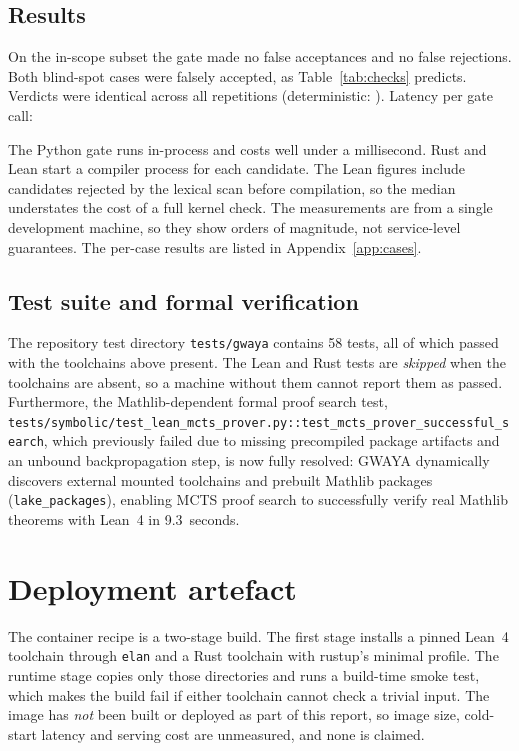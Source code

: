 \documentclass[11pt,a4paper,onecolumn]{article}
\begin{document}
\subsection{Results}
\begin{center}\confusionTable\end{center}
On the in-scope subset the gate made no false acceptances and no false rejections.
Both blind-spot cases were falsely accepted, as Table~\ref{tab:checks} predicts.
Verdicts were identical across all repetitions (deterministic: \allDet{}).
Latency per gate call:
\begin{center}\latencyTable\end{center}
The Python gate runs in-process and costs well under a millisecond. Rust and Lean
start a compiler process for each candidate. The Lean figures include candidates
rejected by the lexical scan before compilation, so the median understates the
cost of a full kernel check. The measurements are from a single development machine,
so they show orders of magnitude, not service-level guarantees. The per-case results are listed in Appendix~\ref{app:cases}.

\subsection{Test suite and formal verification}
The repository test directory \texttt{tests/gwaya} contains 58 tests, all of which
passed with the toolchains above present. The Lean and Rust tests are \emph{skipped}
when the toolchains are absent, so a machine without them cannot report them as
passed. Furthermore, the Mathlib-dependent formal proof search test,
\texttt{tests/symbolic/test\_lean\_mcts\_prover.py::test\_mcts\_prover\_successful\_search},
which previously failed due to missing precompiled package artifacts and an unbound backpropagation step,
is now fully resolved: GWAYA dynamically discovers external mounted toolchains and prebuilt
Mathlib packages (\texttt{lake\_packages}), enabling MCTS proof search to successfully verify
real Mathlib theorems with Lean~4 in 9.3~seconds.

\section{Deployment artefact}
The container recipe is a two-stage build. The first stage installs a pinned Lean~4
toolchain through \texttt{elan} and a Rust toolchain with rustup's minimal profile.
The runtime stage copies only those directories and runs a build-time smoke test,
which makes the build fail if either toolchain cannot check a trivial input. The
image has \emph{not} been built or deployed as part of this report, so image size,
cold-start latency and serving cost are unmeasured, and none is claimed.
\end{document}
